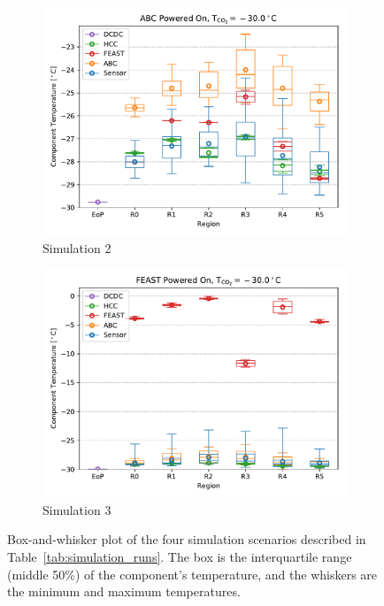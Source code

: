\begin{figure}[ht!]
\begin{subfigure}[t]{0.50\textwidth}\includegraphics[width=0.99\linewidth]{figures/FEA_20171207_m30p0C_0p0Wm2C_DP1_ALL_S2.pdf}\vspace{-3mm}\caption{Simulation 2}\end{subfigure}
\begin{subfigure}[t]{0.50\textwidth}\includegraphics[width=0.99\linewidth]{figures/FEA_20171207_m30p0C_0p0Wm2C_DP1_ALL_S3.pdf}\vspace{-3mm}\caption{Simulation 3}\end{subfigure}
\caption{Box-and-whisker plot of the four simulation scenarios described in Table~\ref{tab:simulation_runs}.
The box is the interquartile range (middle 50\%) of the component's temperature, and the whiskers are
the minimum and maximum temperatures.}
\label{thermal_data}
\end{figure}

